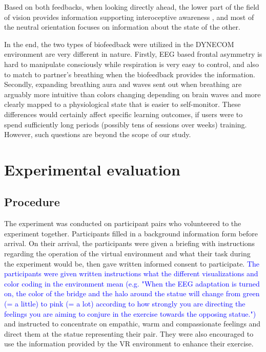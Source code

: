 \documentclass[manuscript, review = false, screen]{acmart}
\begin{document}
Based on both feedbacks, when looking directly ahead, the lower part of the field of vision provides information supporting interoceptive awareness \cite{Craig2002, dunn2010listening}, and most of the neutral orientation focuses on information about the state of the other.

In the end, the two types of biofeedback were utilized in the DYNECOM environment are very different in nature. Firstly, EEG based frontal asymmetry is hard to manipulate consciously while respiration is very easy to control, and also to match to partner's breathing when the biofeedback provides the information. Secondly, expanding breathing aura and waves sent out when breathing are arguably more intuitive than colors changing depending on brain waves and more clearly mapped to a physiological state that is easier to self-monitor. These differences would certainly affect specific learning outcomes, if users were to spend sufficiently long periods (possibly tens of sessions over weeks) training. However, such questions are beyond the scope of our study.



\section{Experimental evaluation}
\subsection{Procedure}
The experiment was conducted on participant pairs who volunteered to the experiment together. Participants filled in a background information form before arrival. On their arrival, the participants were given a briefing with instructions regarding the operation of the virtual environment and what their task during the experiment would be, then gave written informed consent to participate. \textcolor{blue}{The participants were given written instructions what the different visualizations and color coding in the environment mean (e.g. "When the EEG adaptation is turned on, the color of the bridge and the halo around the statue will change from green (= a little) to pink (= a lot) according to how strongly you are directing the feelings you are aiming to conjure in the exercise towards the opposing statue.")} and instructed to concentrate on empathic, warm and compassionate feelings and direct them at the statue representing their pair. They were also encouraged to use the information provided by the VR environment to enhance their exercise.
\end{document}
